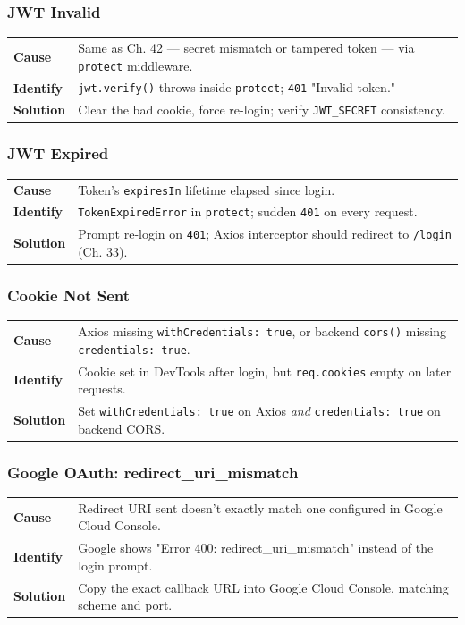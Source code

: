 \subsubsection*{JWT Invalid}
\noindent\begin{tabularx}{\textwidth}{@{}>{\bfseries}p{2.3cm}X@{}}
\toprule
Cause & Same as Ch. 42 --- secret mismatch or tampered token --- via \texttt{protect} middleware. \\
Identify & \texttt{jwt.verify()} throws inside \texttt{protect}; \texttt{401} "Invalid token." \\
Solution & Clear the bad cookie, force re-login; verify \texttt{JWT\_SECRET} consistency. \\
\bottomrule
\end{tabularx}

\subsubsection*{JWT Expired}
\noindent\begin{tabularx}{\textwidth}{@{}>{\bfseries}p{2.3cm}X@{}}
\toprule
Cause & Token's \texttt{expiresIn} lifetime elapsed since login. \\
Identify & \texttt{TokenExpiredError} in \texttt{protect}; sudden \texttt{401} on every request. \\
Solution & Prompt re-login on \texttt{401}; Axios interceptor should redirect to \texttt{/login} (Ch. 33). \\
\bottomrule
\end{tabularx}

\subsubsection*{Cookie Not Sent}
\noindent\begin{tabularx}{\textwidth}{@{}>{\bfseries}p{2.3cm}X@{}}
\toprule
Cause & Axios missing \texttt{withCredentials: true}, or backend \texttt{cors()} missing \texttt{credentials: true}. \\
Identify & Cookie set in DevTools after login, but \texttt{req.cookies} empty on later requests. \\
Solution & Set \texttt{withCredentials: true} on Axios \emph{and} \texttt{credentials: true} on backend CORS. \\
\bottomrule
\end{tabularx}

\subsubsection*{Google OAuth: redirect\_uri\_mismatch}
\noindent\begin{tabularx}{\textwidth}{@{}>{\bfseries}p{2.3cm}X@{}}
\toprule
Cause & Redirect URI sent doesn't exactly match one configured in Google Cloud Console. \\
Identify & Google shows "Error 400: redirect\_uri\_mismatch" instead of the login prompt. \\
Solution & Copy the exact callback URL into Google Cloud Console, matching scheme and port. \\
\bottomrule
\end{tabularx}

